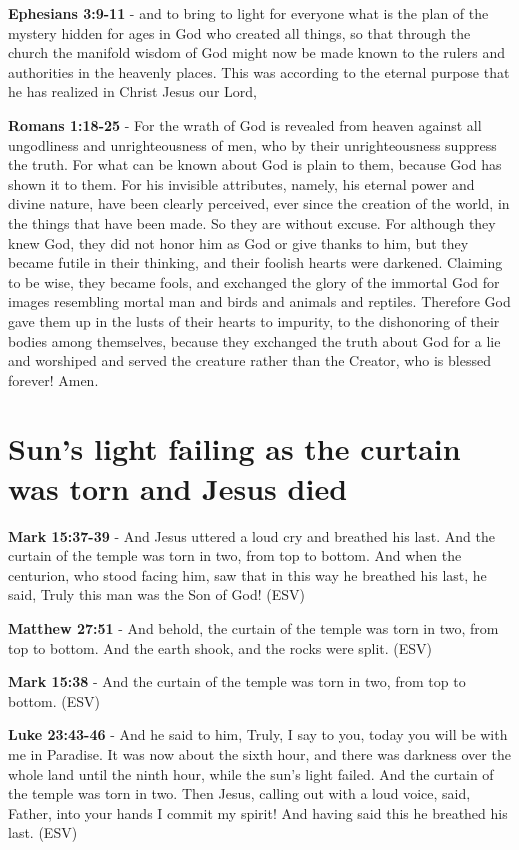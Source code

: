 \documentclass[11pt]{article}
\begin{document}
\textbf{Ephesians 3:9-11} - and to bring to light for everyone what is the plan of the mystery hidden for ages in God who created all things, so that through the church the manifold wisdom of God might now be made known to the rulers and authorities in the heavenly places. This was according to the eternal purpose that he has realized in Christ Jesus our Lord,

\textbf{Romans 1:18-25} - For the wrath of God is revealed from heaven against all ungodliness and unrighteousness of men, who by their unrighteousness suppress the truth. For what can be known about God is plain to them, because God has shown it to them. For his invisible attributes, namely, his eternal power and divine nature, have been clearly perceived, ever since the creation of the world, in the things that have been made. So they are without excuse. For although they knew God, they did not honor him as God or give thanks to him, but they became futile in their thinking, and their foolish hearts were darkened. Claiming to be wise, they became fools, and exchanged the glory of the immortal God for images resembling mortal man and birds and animals and reptiles. Therefore God gave them up in the lusts of their hearts to impurity, to the dishonoring of their bodies among themselves, because they exchanged the truth about God for a lie and worshiped and served the creature rather than the Creator, who is blessed forever! Amen.

\section{Sun's light failing as the curtain was torn and Jesus died}
\label{sec:org561c9a2}
\textbf{Mark 15:37-39} - And Jesus uttered a loud cry and breathed his last. And the curtain of the temple was torn in two, from top to bottom. And when the centurion, who stood facing him, saw that in this way he breathed his last, he said, Truly this man was the Son of God! (ESV)

\textbf{Matthew 27:51} - And behold, the curtain of the temple was torn in two, from top to bottom. And the earth shook, and the rocks were split. (ESV)

\textbf{Mark 15:38} - And the curtain of the temple was torn in two, from top to bottom. (ESV)

\textbf{Luke 23:43-46} - And he said to him, Truly, I say to you, today you will be with me in Paradise. It was now about the sixth hour, and there was darkness over the whole land until the ninth hour, while the sun's light failed. And the curtain of the temple was torn in two. Then Jesus, calling out with a loud voice, said, Father, into your hands I commit my spirit! And having said this he breathed his last. (ESV)
\end{document}
